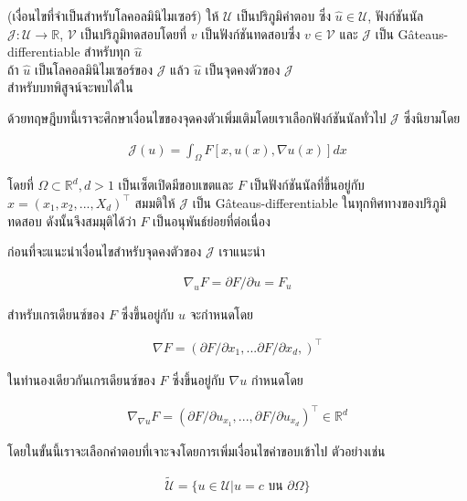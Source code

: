 \begin{Theorem}
    (เงื่อนไขที่จำเป็นสำหรับโลคอลมินิไมเซอร์) ให้ $\mathcal{U}$ เป็นปริภูมิคำตอบ ซึ่ง $\hat{u} \in \mathcal{U}$, ฟังก์ชันนัล $\mathcal{J} : \mathcal{U} \rightarrow \mathbb{R}$, $\mathcal{V}$ เป็นปริภูมิทดสอบโดยที่ $v$ เป็นฟังก์ชันทดสอบซึ่ง $v \in \mathcal{V}$ และ $\mathcal{J}$ เป็น G\^{a}teaus-differentiable สำหรับทุก $\hat{u}$\\
    ถ้า $\hat{u}$ เป็นโลคอลมินิไมเซอร์ของ $\mathcal{J}$ แล้ว $\hat{u}$ เป็นจุดคงตัวของ  $\mathcal{J}$\\
    สำหรับบทพิสูจน์จะพบได้ใน \cite{ref:calculus_of_variation}
    \label{theroem:nessery_minimizer}
\end{Theorem}

ด้วยทฤษฎีบทนี้เราจะศึกษาเงื่อนไขของจุดคงตัวเพิ่มเติมโดยเราเลือกฟังก์ชันนัลทั่วไป $\mathcal{J}$ ซึ่งนิยามโดย

\begin{align}
    \mathcal{J}(u) = \int_{\Omega} F[x,u(x),\nabla u(x)] dx
    \label{equation:general_functional}
\end{align}

โดยที่ $\Omega \subset \mathbb{R}^{d}, d>1$ เป็นเซ็ตเปิดมีขอบเขตและ $F$ เป็นฟังก์ชันนัลที่ขึ้นอยู่กับ $x=(x_1,x_2,...,X_d)^\top$ สมมติให้ $\mathcal{J}$ เป็น G\^{a}teaus-differentiable ในทุกทิศทางของปริภูมิทดสอบ ดังนั้นจึงสมมุติได้ว่า $F$  เป็นอนุพันธ์ย่อยที่ต่อเนื่อง

ก่อนที่จะแนะนำเงื่อนไขสำหรับจุดคงตัวของ $\mathcal{J}$ เราแนะนำ

\begin{align}
    \nabla_{u} F = \partial F / \partial u = F_u
\end{align}

สำหรับเกรเดียนซ์ของ $F$ ซึ่งขึ้นอยู่กับ $u$ จะกำหนดโดย

\begin{align}
    \nabla F = (\partial F / \partial x_1, ... \partial F / \partial x_d, )^\top
\end{align}

ในทำนองเดียวกันเกรเดียนซ์ของ $F$ ซึ่งขึ้นอยู่กับ $\nabla u$ กำหนดโดย

\begin{align}
    \nabla_{\nabla u} F = (\partial F / \partial u_{x_1},..., \partial F / \partial u_{x_d})^\top \in \mathbb{R}^d
\end{align}

โดยในขั้นนี้เราจะเลือกคำตอบที่เจาะจงโดยการเพิ่มเงื่อนไขค่าขอบเข้าไป ตัวอย่างเช่น

\begin{align}
    \tilde{\mathcal{U}} = \{u \in \mathcal{U} | u = c \text{ บน } \partial \Omega \}
\end{align}

